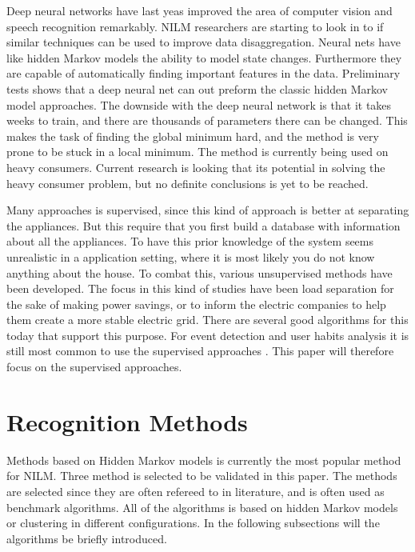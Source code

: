 Deep neural networks have last yeas improved the area of computer vision and speech recognition remarkably. NILM researchers are starting to look in to if similar techniques can be used to improve data disaggregation. Neural nets have like hidden Markov models the ability to model state changes. Furthermore they are capable of automatically finding important features in the data. Preliminary tests shows that a deep neural net can out preform the classic hidden Markov model approaches. The downside with the deep neural network is that it takes weeks to train, and there are thousands of parameters there can be changed. This makes the task of finding the global minimum hard, and the method is very prone to be stuck in a local minimum. The method is currently being used on heavy consumers\citep{RefWorks:25}. Current research is looking that its potential in solving the heavy consumer problem, but no definite conclusions is yet to be reached. 

Many approaches is supervised, since this kind of approach is better at separating the appliances. But this require that you first build a database with information about all the appliances. To have this prior knowledge of the system seems unrealistic in a application setting, where it is most likely you do not know anything about the house. To combat this, various unsupervised methods have been developed. The focus in this kind of studies have been load separation for the sake of making power savings, or to inform the electric companies to help them create a more stable electric grid. There are several good algorithms for this today that support this purpose. For event detection and user habits analysis it is still most common to use the supervised approaches \citep{RefWorks:19}. This paper will therefore focus on the supervised approaches. 

\newpage
			

\section{Recognition Methods}
\label{RecognitionMethods}
Methods based on Hidden Markov models is currently the most popular method for NILM. Three method is selected to be validated in this paper. The methods are selected since they are often refereed to in literature, and is often used as benchmark algorithms. All of the algorithms is based on hidden Markov models or clustering in different configurations. In the following subsections will the algorithms be briefly introduced. 

